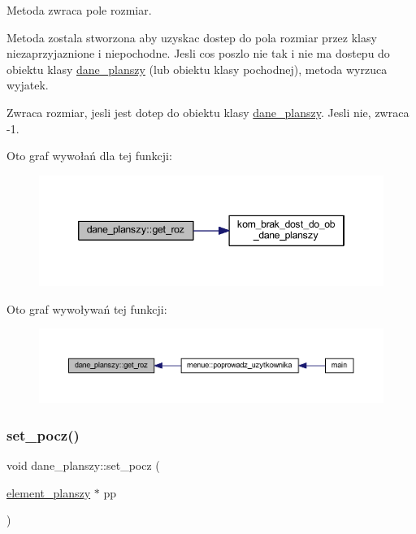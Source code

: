 Metoda zwraca pole rozmiar.

Metoda zostala stworzona aby uzyskac dostep do pola rozmiar przez klasy niezaprzyjaznione i niepochodne. Jesli cos poszlo nie tak i nie ma dostepu do obiektu klasy \mbox{\hyperlink{classdane__planszy}{dane\+\_\+planszy}} (lub obiektu klasy pochodnej), metoda wyrzuca wyjatek. \begin{DoxyReturn}{Zwraca}
rozmiar, jesli jest dotep do obiektu klasy \mbox{\hyperlink{classdane__planszy}{dane\+\_\+planszy}}. Jesli nie, zwraca -\/1. 
\end{DoxyReturn}
Oto graf wywołań dla tej funkcji\+:
\nopagebreak
\begin{figure}[H]
\begin{center}
\leavevmode
\includegraphics[width=346pt]{classdane__planszy_a67238befe224aca22577d787df2dffa9_cgraph}
\end{center}
\end{figure}
Oto graf wywoływań tej funkcji\+:
\nopagebreak
\begin{figure}[H]
\begin{center}
\leavevmode
\includegraphics[width=350pt]{classdane__planszy_a67238befe224aca22577d787df2dffa9_icgraph}
\end{center}
\end{figure}
\mbox{\label{classdane__planszy_abd328051f43a94315eccb2a80fcb4593}} 
\subsubsection{\texorpdfstring{set\+\_\+pocz()}{set\_pocz()}}
{\footnotesize\ttfamily void dane\+\_\+planszy\+::set\+\_\+pocz (\begin{DoxyParamCaption}\item[{\mbox{\hyperlink{classelement__planszy}{element\+\_\+planszy}} $\ast$}]{pp }\end{DoxyParamCaption})}

